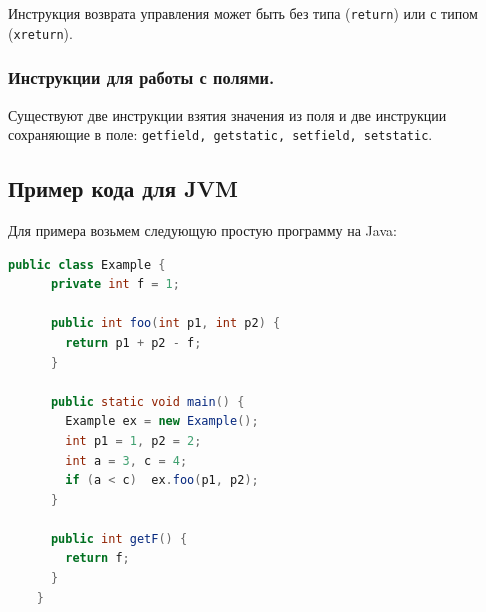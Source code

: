Инструкция возврата управления может быть без типа (\texttt{return}) или с типом (\texttt{xreturn}).

\subsubsection{Инструкции для работы с полями.}
Существуют две инструкции взятия значения из поля и две инструкции сохраняющие в поле: \texttt{getfield, getstatic, setfield, setstatic}.

\subsection{Пример кода для JVM}

Для примера возьмем следующую простую программу на Java:

\begin{lstlisting}[language = Java]
    public class Example {
      private int f = 1; 

      public int foo(int p1, int p2) {
        return p1 + p2 - f;
      }

      public static void main() {
        Example ex = new Example();
        int p1 = 1, p2 = 2;
        int a = 3, c = 4;
        if (a < c)  ex.foo(p1, p2);
      }

      public int getF() {
        return f;
      }
    }
\end{lstlisting}


